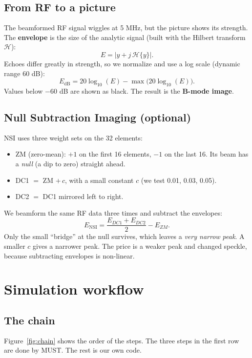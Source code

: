 \documentclass[11pt,a4paper]{article}
\begin{document}
\subsection{From RF to a picture}
The beamformed RF signal wiggles at 5 MHz, but the picture shows its strength. The \textbf{envelope} is the size of the analytic signal (built with the Hilbert transform $\mathcal{H}$):
\begin{equation}
E = \left| y + j\,\mathcal{H}\{y\} \right|.
\end{equation}
Echoes differ greatly in strength, so we normalize and use a log scale (dynamic range 60 dB):
\begin{equation}
E_{\text{dB}} = 20\log_{10}(E) - \max\big(20\log_{10}(E)\big).
\end{equation}
Values below $-60$ dB are shown as black. The result is the \textbf{B-mode image}.

\subsection{Null Subtraction Imaging (optional)}
NSI uses three weight sets on the 32 elements:
\begin{itemize}
\item ZM (zero-mean): $+1$ on the first 16 elements, $-1$ on the last 16. Its beam has a \emph{null} (a dip to zero) straight ahead.
\item DC1 $=$ ZM $+\,c$, with a small constant $c$ (we test 0.01, 0.03, 0.05).
\item DC2 $=$ DC1 mirrored left to right.
\end{itemize}
We beamform the same RF data three times and subtract the envelopes:
\begin{equation}
E_{\text{NSI}} = \frac{E_{DC1}+E_{DC2}}{2} - E_{ZM}.
\end{equation}
Only the small ``bridge'' at the null survives, which leaves a \emph{very narrow peak}. A smaller $c$ gives a narrower peak. The price is a weaker peak and changed speckle, because subtracting envelopes is non-linear.

\section{Simulation workflow}

\subsection{The chain}
Figure~\ref{fig:chain} shows the order of the steps. The three steps in the first row are done by MUST. The rest is our own code.
\end{document}
